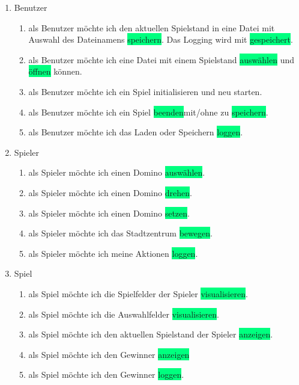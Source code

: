 \begin{enumerate}
	\item Benutzer
	\begin{enumerate}
		\item als \colorbox{Apricot}{Benutzer} möchte ich den aktuellen Spielstand in eine Datei mit Auswahl des Dateinamens \colorbox{SpringGreen}{speichern}. Das Logging wird mit \colorbox{SpringGreen}{gespeichert}.
		\item als \colorbox{Apricot}{Benutzer} möchte ich eine Datei mit einem Spielstand  \colorbox{SpringGreen}{auswählen} und \colorbox{SpringGreen}{öffnen} können.
		\item als \colorbox{Apricot}{Benutzer} möchte ich ein \colorbox{Apricot}{Spiel} initialisieren und neu starten.
		\item als \colorbox{Apricot}{Benutzer} möchte ich ein \colorbox{Apricot}{Spiel} \colorbox{SpringGreen}{beenden}mit/ohne zu \colorbox{SpringGreen}{speichern}.
		\item als \colorbox{Apricot}{Benutzer} möchte ich das Laden oder Speichern  \colorbox{SpringGreen}{loggen}.
	\end{enumerate}	
	\item Spieler
	\begin{enumerate}
		\item als \colorbox{Apricot}{Spieler} möchte ich einen \colorbox{Apricot}{Domino} \colorbox{SpringGreen}{auswählen}.
 		\item als \colorbox{Apricot}{Spieler} möchte ich einen \colorbox{Apricot}{Domino} \colorbox{SpringGreen}{drehen}.
		\item als \colorbox{Apricot}{Spieler} möchte ich einen \colorbox{Apricot}{Domino} \colorbox{SpringGreen}{setzen}.
		\item als \colorbox{Apricot}{Spieler} möchte ich das Stadtzentrum \colorbox{SpringGreen}{bewegen}.
		\item als \colorbox{Apricot}{Spieler} möchte ich meine Aktionen \colorbox{SpringGreen}{loggen}.
	\end{enumerate}
	\item Spiel
	\begin{enumerate}
		\item als \colorbox{Apricot}{Spiel} möchte ich die \colorbox{Apricot}{Spielfelder} der Spieler \colorbox{SpringGreen}{visualisieren}.
		\item als \colorbox{Apricot}{Spiel} möchte ich die \colorbox{Apricot}{Auswahlfelder} \colorbox{SpringGreen}{visualisieren}.
		\item als \colorbox{Apricot}{Spiel} möchte ich den aktuellen Spielstand der Spieler \colorbox{SpringGreen}{anzeigen}.
		\item als \colorbox{Apricot}{Spiel} möchte ich den \colorbox{Apricot}{Gewinner} \colorbox{SpringGreen}{anzeigen}
		\item als \colorbox{Apricot}{Spiel} möchte ich den \colorbox{Apricot}{Gewinner} \colorbox{SpringGreen}{loggen}.
	\end{enumerate}
\end{enumerate}

